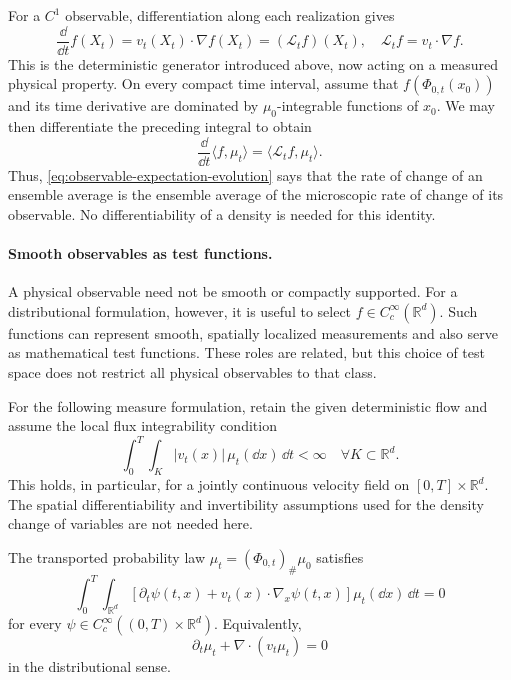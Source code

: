 \documentclass[12pt,a4paper,oneside]{book}
\begin{document}
For a $C^1$ observable, differentiation along each realization gives
\begin{equation*}
    \frac{\dd}{\dd t}f(X_t) 
    =v_t(X_t)\cdot\nabla f(X_t)
    =(\mathcal L_t f)(X_t), \quad \mathcal L_t f=v_t\cdot\nabla f.
\end{equation*}
This is the deterministic generator introduced above, now acting on a measured physical property. On every compact time 
interval, assume that $f(\Phi_{0,t}(x_0))$ and its time derivative are dominated by $\mu_0$-integrable functions of $x_0$. 
We may then differentiate the preceding integral to obtain
\begin{equation}
    \frac{\dd}{\dd t}\langle f,\mu_t\rangle = \langle\mathcal L_t f,\mu_t\rangle.
    \label{eq:observable-expectation-evolution}
\end{equation}
Thus, \eqref{eq:observable-expectation-evolution} says that the rate of change of an ensemble average is the ensemble average of the microscopic rate of change of its observable.
No differentiability of a density is needed for this identity.

\paragraph{Smooth observables as test functions.}
A physical observable need not be smooth or compactly supported. For a distributional formulation, however, it is useful
to select $f\in C_c^\infty(\mathbb R^d)$. Such functions can represent smooth, spatially localized measurements and also
serve as mathematical test functions. These roles are related, but this choice of test space does not restrict all
physical observables to that class.

For the following measure formulation, retain the given deterministic flow and assume the local flux integrability condition
\begin{equation*}
    \int_0^T\int_K |v_t(x)|\,\mu_t(\dd x)\,\dd t<\infty \quad \forall K\subset\mathbb R^d.
\end{equation*}
This holds, in particular, for a jointly continuous velocity field on $[0,T]\times\mathbb R^d$. The spatial differentiability 
and invertibility assumptions used for the density change of variables are not needed here.

\begin{proposition}
\label{prop:weak-continuity}
The transported probability law $\mu_t=(\Phi_{0,t})_\#\mu_0$ satisfies
\begin{equation}
    \int_0^T\int_{\mathbb R^d}
        \left[
            \partial_t\psi(t,x)+v_t(x)\cdot\nabla_x\psi(t,x)
        \right]
    \mu_t(\dd x)\,\dd t=0
    \label{eq:weak-measure-continuity}
\end{equation}
for every $\psi\in C_c^\infty((0,T)\times\mathbb R^d)$. Equivalently,
\begin{equation*}
    \partial_t\mu_t+\nabla\cdot(v_t\mu_t)=0
\end{equation*}
in the distributional sense.
\end{proposition}
\end{document}

